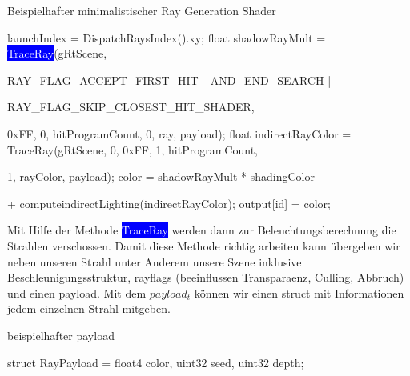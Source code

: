 \begin{tcolorbox}
\begin{algorithm}[H]
    \caption{Beispielhafter minimalistischer Ray Generation Shader}
    \begin{algorithmic}[1]
        \State launchIndex = DispatchRaysIndex().xy;
            \State float shadowRayMult = \colorbox{blue}{\textcolor{white}{TraceRay}}(gRtScene,\par
            RAY\_FLAG\_ACCEPT\_FIRST\_HIT \_AND\_END\_SEARCH |\par
            RAY\_FLAG\_SKIP\_CLOSEST\_HIT\_SHADER,\par
            0xFF, 0, hitProgramCount, 0, ray, payload);
            \State float indirectRayColor = TraceRay(gRtScene, 0, 0xFF, 1, hitProgramCount,\par
            1, rayColor, payload);
            \State color = shadowRayMult * shadingColor \par
            + computeindirectLighting(indirectRayColor);
        \EndFor
        \State output[id] = color;
    \end{algorithmic}
    \label{alg:Ray Gen}
\end{algorithm}
\end{tcolorbox}

Mit Hilfe der Methode \colorbox{blue}{\textcolor{white}{TraceRay}} werden dann zur Beleuchtungsberechnung 
die Strahlen verschossen. Damit diese Methode richtig arbeiten kann übergeben wir neben unseren Strahl 
unter Anderem  unsere Szene inklusive Beschleunigungsstruktur, rayflags 
(beeinflussen Transparaenz, Culling, Abbruch)\cite{RayFlags} und einen payload.
Mit dem \textit{$payload_t$} können wir einen struct mit Informationen jedem einzelnen Strahl mitgeben.

\begin{tcolorbox}
\begin{algorithm}[H]
    \caption{beispielhafter payload}
    \begin{algorithmic}[1]
        \State struct RayPayload = {float4 color, uint32 seed, uint32 depth};        
        \end{algorithmic}
        \label{alg:payload}
\end{algorithm}
\end{tcolorbox}
    
